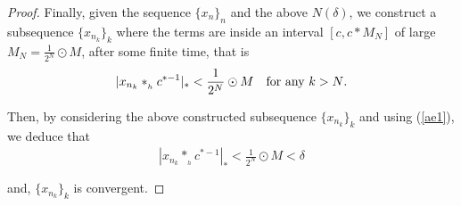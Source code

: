 \documentclass[10pt]{amsart}
\numberwithin{equation}{section}
\begin{document}
\begin{proof}

Finally, given the sequence $\{x_{n}\}_{n}$ and the above $N(\delta)$, we construct a subsequence $\{x_{n_{k}}\}_{k}$ where the terms
are inside an interval $[c,c\ast M_{N}]$ of large $M_{N}=\frac{1}{2^{N}}\odot M$, after some finite time, that is 
\begin{equation*}
|x_{n_{k}}\ast_{_h} c^{\ast-1}|_{\ast}<\frac{1}{2^{N}}\odot M \quad \textnormal{for any $k > N$}.
\end{equation*}

Then, by considering the above constructed subsequence $\{x_{n_{k}}\}_{k}$ and using 
(\ref{ae1}), 
we deduce that
\begin{displaymath}
\begin{array}{rcl}
\displaystyle |x_{n_{k}}\ast_{_h} c^{\ast-1}|_{\ast}<  \frac{1}{2^{{N}}}\odot M  < \delta\\\\
\end{array}
\end{displaymath}
and, $\{x_{n_{k}}\}_{k}$ is convergent. 





\end{proof}
\end{document}
